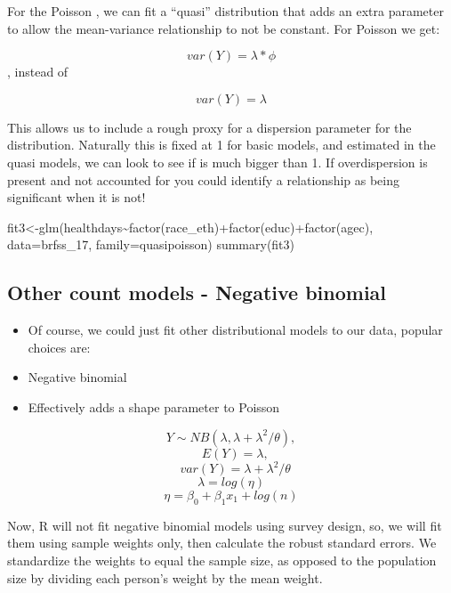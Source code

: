 \documentclass[
]{article}
\newenvironment{Shaded}{\begin{snugshade}}{\end{snugshade}}
\newcommand{\AttributeTok}[1]{\textcolor[rgb]{0.77,0.63,0.00}{#1}}
\newcommand{\FunctionTok}[1]{\textcolor[rgb]{0.00,0.00,0.00}{#1}}
\newcommand{\NormalTok}[1]{#1}
\newcommand{\OtherTok}[1]{\textcolor[rgb]{0.56,0.35,0.01}{#1}}
\newcommand{\SpecialCharTok}[1]{\textcolor[rgb]{0.00,0.00,0.00}{#1}}
\begin{document}
For the Poisson , we can fit a ``quasi'' distribution that adds an extra parameter to allow the mean-variance relationship to not be constant. For Poisson we get:

\[var(Y) = \lambda * \phi\] , instead of

\[var(Y) = \lambda \]

This allows us to include a rough proxy for a dispersion parameter for the distribution. Naturally this is fixed at 1 for basic models, and estimated in the quasi models, we can look to see if is much bigger than 1. If overdispersion is present and not accounted for you could identify a relationship as being significant when it is not!

\begin{Shaded}
\begin{Highlighting}[]
\NormalTok{fit3}\OtherTok{\textless{}{-}}\FunctionTok{glm}\NormalTok{(healthdays}\SpecialCharTok{\textasciitilde{}}\FunctionTok{factor}\NormalTok{(race\_eth)}\SpecialCharTok{+}\FunctionTok{factor}\NormalTok{(educ)}\SpecialCharTok{+}\FunctionTok{factor}\NormalTok{(agec), }\AttributeTok{data=}\NormalTok{brfss\_17, }\AttributeTok{family=}\NormalTok{quasipoisson)}
\FunctionTok{summary}\NormalTok{(fit3)}
\end{Highlighting}
\end{Shaded}

\hypertarget{other-count-models---negative-binomial}{%
\subsection{Other count models - Negative binomial}\label{other-count-models---negative-binomial}}

\begin{itemize}
\item
  Of course, we could just fit other distributional models to our data, popular choices are:
\item
  Negative binomial
\item
  Effectively adds a shape parameter to Poisson
\end{itemize}

\[Y \sim NB (\lambda, \lambda+\lambda^2/\theta),\] \[\text{   } E(Y) = \lambda,\] \[\text{   } var(Y) = \lambda+\lambda^2/\theta\] \[\lambda = log(\eta)\] \[\eta = \beta_0 + \beta_1 x_1+ log(n)\]

Now, R will not fit negative binomial models using survey design, so, we will fit them using sample weights only, then calculate the robust standard errors. We standardize the weights to equal the sample size, as opposed to the population size by dividing each person's weight by the mean weight.
\end{document}
